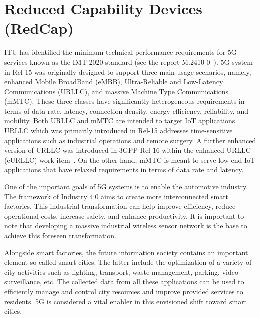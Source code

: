 \documentclass[]{IEEEtran}
\begin{document}
\section{Reduced Capability Devices (RedCap)}
\label{sec:3-RedCap-Intro}



ITU has identified the minimum technical performance requirements for 5G services known as the IMT-2020 standard (see the report M.2410-0~\cite{itu-r_minimum_2017_M.2410-0}).
5G system in Rel-15 was originally designed to support three main usage scenarios, namely, enhanced Mobile BroadBand (eMBB), Ultra-Reliable and Low-Latency Communications (URLLC), and massive Machine Type Communications (mMTC).
These three classes have significantly heterogeneous requirements in terms of data rate, latency, connection density, energy efficiency, reliability, and mobility.
 Both URLLC and mMTC are intended to target IoT applications.
 URLLC which was primarily introduced in Rel-15 addresses time-sensitive applications such as industrial operations and remote surgery.
 A further enhanced version of URLLC was introduced in 3GPP Rel-16 within the enhanced URLLC (eURLLC) work item~\cite{3gpp_study_nodate_38.824}.
 On the other hand, mMTC is meant to serve low-end IoT applications that have relaxed requirements in terms of data rate and latency.
 
One of the important goals of 5G systems is to enable the automotive industry.
The framework of Industry 4.0 aims to create more interconnected smart factories.
This industrial transformation can help improve efficiency, reduce operational costs, increase safety, and enhance productivity.
It is important to note that developing a massive industrial wireless sensor network is the base to achieve this foreseen transformation.

Alongside smart factories, the future information society contains an important element so-called smart cities. The latter include the optimization of a variety of city activities such as lighting, transport, waste management, parking, video surveillance, etc.
The collected data from all these applications can be used to efficiently manage and control city resources and improve provided services to residents.
5G is considered a vital enabler in this envisioned shift toward smart cities.
\end{document}
